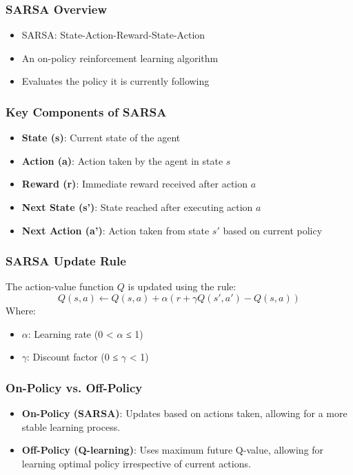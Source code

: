 \documentclass[aspectratio=169]{beamer}
\begin{document}
\begin{frame}[fragile]
    \frametitle{SARSA Overview}
    \begin{itemize}
        \item SARSA: State-Action-Reward-State-Action
        \item An on-policy reinforcement learning algorithm
        \item Evaluates the policy it is currently following
    \end{itemize}
\end{frame}

\begin{frame}[fragile]
    \frametitle{Key Components of SARSA}
    \begin{itemize}
        \item \textbf{State (s)}: Current state of the agent
        \item \textbf{Action (a)}: Action taken by the agent in state \( s \)
        \item \textbf{Reward (r)}: Immediate reward received after action \( a \)
        \item \textbf{Next State (s')}: State reached after executing action \( a \)
        \item \textbf{Next Action (a')}: Action taken from state \( s' \) based on current policy
    \end{itemize}
\end{frame}

\begin{frame}[fragile]
    \frametitle{SARSA Update Rule}
    The action-value function \( Q \) is updated using the rule:
    \begin{equation}
        Q(s, a) \leftarrow Q(s, a) + \alpha \left( r + \gamma Q(s', a') - Q(s, a) \right)
    \end{equation}
    Where:
    \begin{itemize}
        \item \( \alpha \): Learning rate (0 < \( \alpha \) ≤ 1)
        \item \( \gamma \): Discount factor (0 ≤ \( \gamma \) < 1)
    \end{itemize}
\end{frame}

\begin{frame}[fragile]
    \frametitle{On-Policy vs. Off-Policy}
    \begin{itemize}
        \item \textbf{On-Policy (SARSA)}: Updates based on actions taken, allowing for a more stable learning process.
        \item \textbf{Off-Policy (Q-learning)}: Uses maximum future Q-value, allowing for learning optimal policy irrespective of current actions.
    \end{itemize}
\end{frame}
\end{document}
